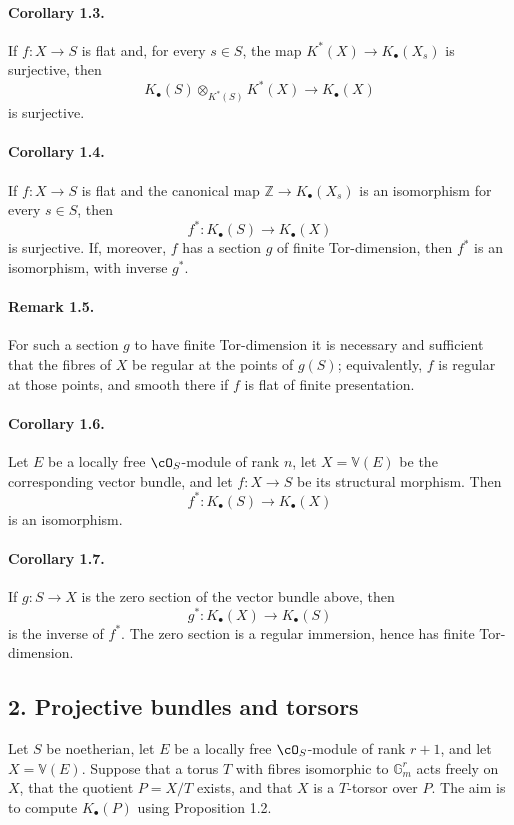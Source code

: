 \documentclass[11pt]{article}
\theoremstyle{plain}
\theoremstyle{definition}
\theoremstyle{remark}
\newcommand{\GG}{\mathbb G}
\newcommand{\ZZ}{\mathbb Z}
\newcommand{\longto}{\longrightarrow}
\providecommand{\VV}{\mathbb V}
\begin{document}
\paragraph{Corollary 1.3.}
If $f:X\to S$ is flat and, for every $s\in S$, the map $K^*(X)\to K_\bullet(X_s)$ is surjective, then
\[
K_\bullet(S)\otimes_{K^*(S)}K^*(X)\longto K_\bullet(X)
\]
is surjective.

\paragraph{Corollary 1.4.}
If $f:X\to S$ is flat and the canonical map $\ZZ\to K_\bullet(X_s)$ is an isomorphism for every $s\in S$, then
\[
f^*:K_\bullet(S)\longto K_\bullet(X)
\]
is surjective. If, moreover, $f$ has a section $g$ of finite Tor-dimension, then $f^*$ is an isomorphism, with inverse $g^*$.

\paragraph{Remark 1.5.}
For such a section $g$ to have finite Tor-dimension it is necessary and sufficient that the fibres of $X$ be regular at the points of $g(S)$; equivalently, $f$ is regular at those points, and smooth there if $f$ is flat of finite presentation.

\paragraph{Corollary 1.6.}
Let $E$ be a locally free $\cO_S$-module of rank $n$, let $X=\VV(E)$ be the corresponding vector bundle, and let $f:X\to S$ be its structural morphism. Then
\[
f^*:K_\bullet(S)\longto K_\bullet(X)
\]
is an isomorphism.

\paragraph{Corollary 1.7.}
If $g:S\to X$ is the zero section of the vector bundle above, then
\[
g^*:K_\bullet(X)\longto K_\bullet(S)
\]
is the inverse of $f^*$. The zero section is a regular immersion, hence has finite Tor-dimension.

\subsection*{2. Projective bundles and torsors}

Let $S$ be noetherian, let $E$ be a locally free $\cO_S$-module of rank $r+1$, and let $X=\VV(E)$. Suppose that a torus $T$ with fibres isomorphic to $\GG_m^r$ acts freely on $X$, that the quotient $P=X/T$ exists, and that $X$ is a $T$-torsor over $P$. The aim is to compute $K_\bullet(P)$ using Proposition 1.2.
\end{document}
